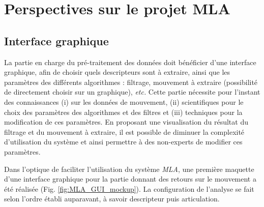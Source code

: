 \section{Perspectives sur le projet MLA}

\subsection{Interface graphique}
La partie en charge du pré-traitement des données doit bénéficier d'une interface graphique, afin de choisir quels descripteurs sont à extraire, ainsi que les paramètres des différents algorithmes : filtrage, mouvement à extraire (possibilité de directement choisir sur un graphique), \textit{etc.} Cette partie nécessite pour l'instant des connaissances (i) sur les données de mouvement, (ii) scientifiques pour le choix des paramètres des algorithmes et des filtres et (iii) techniques pour la modification de ces paramètres. En proposant une visualisation du résultat du filtrage et du mouvement à extraire, il est possible de diminuer la complexité d'utilisation du système et ainsi permettre à des non-experts de modifier ces paramètres.

Dans l'optique de faciliter l'utilisation du système \textit{MLA}, une première maquette d'une interface graphique pour la partie donnant des retours sur le mouvement a été réalisée (Fig. \ref{fig:MLA_GUI_mockup}). La configuration de l'analyse se fait selon l'ordre établi auparavant, à savoir descripteur puis articulation.

